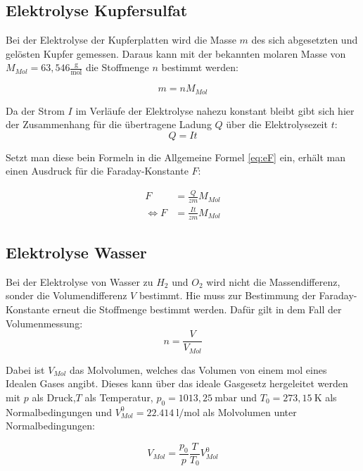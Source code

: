 \subsection{Elektrolyse Kupfersulfat}
Bei der Elektrolyse der Kupferplatten wird die Masse $m$ des sich abgesetzten und gelösten Kupfer gemessen.
Daraus kann mit der bekannten molaren Masse von $M_{Mol} = 63,546 \tfrac{\text{g}}{\text{mol}}$ die Stoffmenge $n$ bestimmt werden:

\begin{equation}
    m = nM_{Mol}
    \label{eq:m}
\end{equation}

Da der Strom $I$ im Verläufe der Elektrolyse nahezu konstant bleibt gibt sich hier der Zusammenhang für die übertragene Ladung $Q$
über die Elektrolysezeit $t$:
\begin{equation}
    Q = It
\end{equation}

Setzt man diese bein Formeln in die Allgemeine Formel \ref{eq:eF} ein, erhält man einen Ausdruck für die Faraday-Konstante $F$:

\begin{align}
    F &= \frac{Q}{zm}M_{Mol} \\
    \Leftrightarrow F &=  \frac{It}{zm}M_{Mol}
    \label{eq:FCu}
\end{align}


\subsection{Elektrolyse Wasser}

Bei der Elektrolyse von Wasser zu $H_2$ und $O_2$ wird nicht die Massendifferenz, sonder die Volumendifferenz $V$ bestimmt.
Hie muss zur Bestimmung der Faraday-Konstante erneut die Stoffmenge bestimmt werden.
Dafür gilt in dem Fall der Volumenmessung:
\begin{equation}
    n = \frac{V}{V_{Mol}}
    \label{eq:n}
\end{equation}

Dabei ist $V_{Mol}$ das Molvolumen, welches das Volumen von einem mol eines Idealen Gases angibt.
Dieses kann über das ideale Gasgesetz hergeleitet werden mit $p$ als Druck,$T$ als Temperatur,
$p_0 = 1013,25\  \text{mbar}$ und $T_0 = 273,15\ \text{K}$ als Normalbedingungen und $V_{Mol}^0 = \SI{22,414}{\litre \per \mole}$ als Molvolumen unter Normalbedingungen:

\begin{equation}
    V_{Mol} = \frac{p_0}{p}\frac{T}{T_0}V_{Mol}^0
    \label{eq:VMol}
\end{equation}

